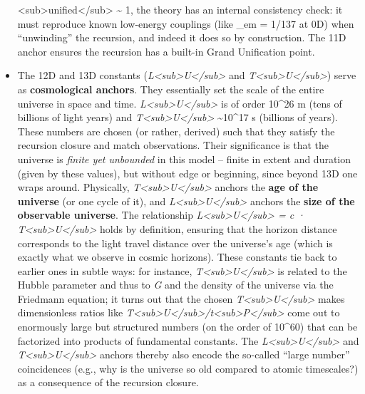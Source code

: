 \documentclass[
]{article}
\begin{document}
\begin{itemize}
  \alpha\textless sub\textgreater unified\textless/sub\textgreater{}
  \textasciitilde{} 1, the theory has an internal consistency check: it
  must reproduce known low-energy couplings (like \alpha\_em = 1/137 at 0D)
  when ``unwinding'' the recursion, and indeed it does so by
  construction. The 11D anchor ensures the recursion has a built-in
  Grand Unification point.
\item
  The 12D and 13D constants
  (\emph{L\textless sub\textgreater U\textless/sub\textgreater{}} and
  \emph{T\textless sub\textgreater U\textless/sub\textgreater{}}) serve
  as \textbf{cosmological anchors}. They essentially set the scale of
  the entire universe in space and time.
  \emph{L\textless sub\textgreater U\textless/sub\textgreater{}} is of
  order 10\^{}26 m (tens of billions of light years) and
  \emph{T\textless sub\textgreater U\textless/sub\textgreater{}}
  \textasciitilde10\^{}17 s (billions of years). These numbers are
  chosen (or rather, derived) such that they satisfy the recursion
  closure and match observations. Their significance is that the
  universe is \emph{finite yet unbounded} in this model -- finite in
  extent and duration (given by these values), but without edge or
  beginning, since beyond 13D one wraps around. Physically,
  \emph{T\textless sub\textgreater U\textless/sub\textgreater{}} anchors
  the \textbf{age of the universe} (or one cycle of it), and
  \emph{L\textless sub\textgreater U\textless/sub\textgreater{}} anchors
  the \textbf{size of the observable universe}. The relationship
  \emph{L\textless sub\textgreater U\textless/sub\textgreater{} = c ·
  T\textless sub\textgreater U\textless/sub\textgreater{}} holds by
  definition\hspace{0pt}, ensuring that the horizon distance corresponds
  to the light travel distance over the universe's age (which is exactly
  what we observe in cosmic horizons). These constants tie back to
  earlier ones in subtle ways: for instance,
  \emph{T\textless sub\textgreater U\textless/sub\textgreater{}} is
  related to the Hubble parameter and thus to \emph{G} and the density
  of the universe via the Friedmann equation\hspace{0pt}; it turns out
  that the chosen
  \emph{T\textless sub\textgreater U\textless/sub\textgreater{}} makes
  dimensionless ratios like
  \emph{T\textless sub\textgreater U\textless/sub\textgreater/t\textless sub\textgreater P\textless/sub\textgreater{}}
  come out to enormously large but structured numbers (on the order of
  10\^{}60) that can be factorized into products of fundamental
  constants. The
  \emph{L\textless sub\textgreater U\textless/sub\textgreater{}} and
  \emph{T\textless sub\textgreater U\textless/sub\textgreater{}} anchors
  thereby also encode the so-called ``large number'' coincidences (e.g.,
  why is the universe so old compared to atomic timescales?) as a
  consequence of the recursion closure.
\end{itemize}
\end{document}
